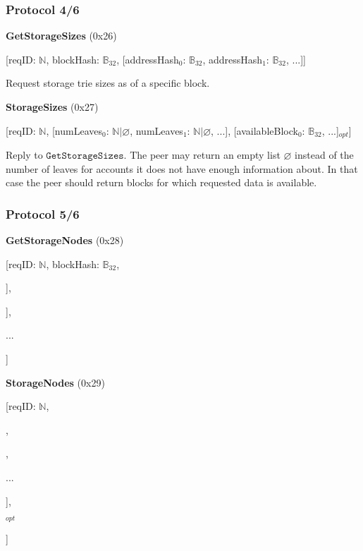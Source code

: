 \documentclass{beamer}
\begin{document}
\begin{frame}
  \frametitle{Protocol 4/6}

  \textbf{GetStorageSizes} (0x26)

  [reqID: $\mathbb{N}$, blockHash: $\mathbb{B}_{32}$,
  [addressHash$_0$: $\mathbb{B}_{32}$, addressHash$_1$: $\mathbb{B}_{32}$, ...]]
  \medskip
  
  Request storage trie sizes as of a specific block.

  \bigskip
  
  \textbf{StorageSizes} (0x27)
  
  [reqID: $\mathbb{N}$,
  [numLeaves$_0$: $\mathbb{N} | \varnothing$, numLeaves$_1$: $\mathbb{N} | \varnothing$, ...],
  [availableBlock$_0$: $\mathbb{B}_{32}$, ...]$_{opt}$]
  \medskip
  
  Reply to $\texttt{GetStorageSizes}$.
  The peer may return an empty list $\varnothing$ instead of the number of leaves for accounts it does not have enough information about.
  In that case the peer should return blocks for which requested data is available.  

\end{frame}

\begin{frame}
  \frametitle{Protocol 5/6}

  \textbf{GetStorageNodes} (0x28)

  [reqID: $\mathbb{N}$, blockHash: $\mathbb{B}_{32}$,
  
  \quad [addressHash$^0$: $\mathbb{B}_{32}$, [prefix$^0_0$: $\mathbb{Y}$, prefix$^0_1$: $\mathbb{Y}$, ...]],
  
  \quad [addressHash$^1$: $\mathbb{B}_{32}$, [prefix$^1_0$: $\mathbb{Y}$, prefix$^1_1$: $\mathbb{Y}$, ...]],
  
  \quad ...
  
  ]
  \bigskip

  \textbf{StorageNodes} (0x29)

[reqID: $\mathbb{N}$,

\quad [

\qquad [node$^0_0$: $\mathbb{B}$, node$^0_1$: $\mathbb{B}$, ...],

,

\qquad ...

\quad ],

$_{opt}$

]

\end{frame}
\end{document}
